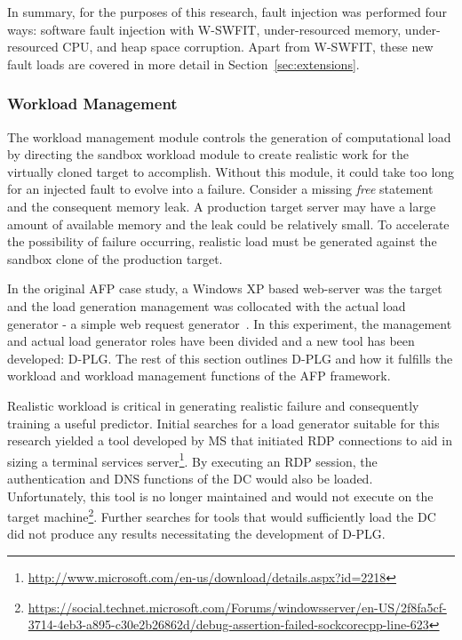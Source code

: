 \tabFaults %

\tabTranslationThirtyTwo
\tabTranslationSixtyFour

In summary, for the purposes of this research, fault injection was performed
four ways: software fault injection with \ac{W-SWFIT}, under-resourced memory,
under-resourced CPU, and heap space corruption.  Apart from \ac{W-SWFIT}, these
new fault loads are covered in more detail in Section~\ref{sec:extensions}.

\subsubsection{Workload Management} \label{sec:workloadMgr} 
The workload management module controls the generation of computational load by
directing the sandbox workload module to create realistic work for the
virtually cloned target to accomplish.  Without this module, it could take too
long for an injected fault to evolve into a failure.  Consider a missing
\emph{free} statement and the consequent memory leak.  A production target
server may have a large amount of available memory and the leak could be
relatively small.  To accelerate the possibility of failure occurring,
realistic load must be generated against the sandbox clone of the production
target.

In the original \ac{AFP} case study, a Windows XP based web-server was the
target and the load generation management was collocated with the actual load
generator - a simple web request generator~\cite{irrera2015}.  In this
experiment, the management and actual load generator roles have been divided
and a new tool has been developed: \ac{D-PLG}.  The rest of this section
outlines \ac{D-PLG} and how it fulfills the workload and workload management
functions of the \ac{AFP} framework.

Realistic workload is critical in generating realistic failure and consequently
training a useful predictor.  Initial searches for a load generator suitable
for this research yielded a tool developed by \ac{MS} that initiated \ac{RDP}
connections to aid in sizing a terminal services
server\footnote{\url{http://www.microsoft.com/en-us/download/details.aspx?id=2218}}.
By executing an \ac{RDP} session, the authentication and \ac{DNS} functions of
the \ac{DC} would also be loaded.  Unfortunately, this tool is no longer
maintained and would not execute on the target
machine\footnote{\url{https://social.technet.microsoft.com/Forums/windowsserver/en-US/2f8fa5cf-3714-4eb3-a895-c30e2b26862d/debug-assertion-failed-sockcorecpp-line-623}}.
Further searches for tools that would sufficiently load the \ac{DC} did not
produce any results necessitating the development of \ac{D-PLG}.

